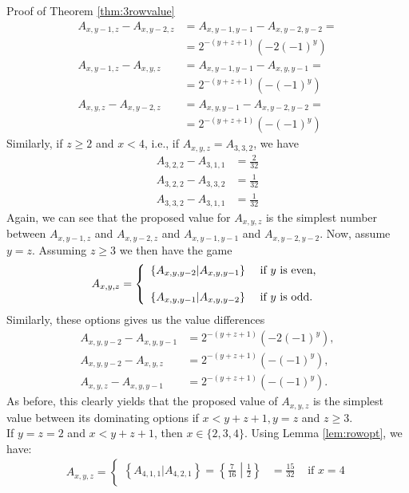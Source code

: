 \begin{proof2}{Proof of Theorem \ref{thm:3rowvalue}}
\begin{align*}
A_{x,y-1,z}-A_{x,y-2,z}&=A_{x,y-1,y-1}-A_{x,y-2,y-2}=\\
&=2^{-(y+z+1)}\left(-2(-1)^y\right)\\
A_{x,y-1,z}-A_{x,y,z}&=A_{x,y-1,y-1}-A_{x,y,y-1}=\\
&=2^{-(y+z+1)}\left(-(-1)^y\right)\\
A_{x,y,z}-A_{x,y-2,z}&=A_{x,y,y-1}-A_{x,y-2,y-2}=\\
&=2^{-(y+z+1)}\left(-(-1)^y\right)
\end{align*}
Similarly, if $z\ge2$ and $x<4$, i.e., if $A_{x,y,z}=A_{3,3,2}$, we have 
\begin{align*}
A_{3,2,2}-A_{3,1,1}&=\frac{2}{32}\\
A_{3,2,2}-A_{3,3,2}&=\frac{1}{32}\\
A_{3,3,2}-A_{3,1,1}&=\frac{1}{32}
\end{align*}
Again, we can see that the proposed value for $A_{x,y,z}$ is the simplest number between $A_{x,y-1,z}$ and $A_{x,y-2,z}$ and $A_{x,y-1,y-1}$ and $A_{x,y-2,y-2}$. 
Now, assume $y=z$. Assuming $z\ge3$ we then have the game
\begin{align*}
A_{x,y,z}=\left\{
\begin{array}{l l}
\left\{A_{x,y,y-2}\middle|A_{x,y,y-1}\right\}&\text{ if $y$ is even,}\\
~\\
\left\{A_{x,y,y-1}\middle|A_{x,y,y-2}\right\}&\text{ if $y$ is odd.}
\end{array}
\right.
\end{align*}
Similarly, these options gives us the value differences
\begin{align*}
A_{x,y,y-2}-A_{x,y,y-1}&=2^{-(y+z+1)}\left(-2(-1)^y\right),\\
A_{x,y,y-2}-A_{x,y,z}&=2^{-(y+z+1)}\left(-(-1)^y\right),\\
A_{x,y,z}-A_{x,y,y-1}&=2^{-(y+z+1)}\left(-(-1)^y\right).
\end{align*}
As before, this clearly yields that the proposed value of $A_{x,y,z}$ is the simplest value between its dominating options if $x<y+z+1,y=z$ and $z\ge3$.
\\
If $y=z=2$ and $x<y+z+1$, then $x\in \{2,3,4\}$. Using Lemma \ref{lem:rowopt}, we have:
\begin{align*}
A_{x,y,z}=\left\{
\begin{array}{lll}
\left\{A_{4,1,1}|A_{4,2,1}\right\}=\left\{\frac{7}{16}\middle|\frac{1}{2}\right\}&=\frac{15}{32}&\text{ if $x=4$}\\

\end{array}
\end{align*}
\end{proof2}
